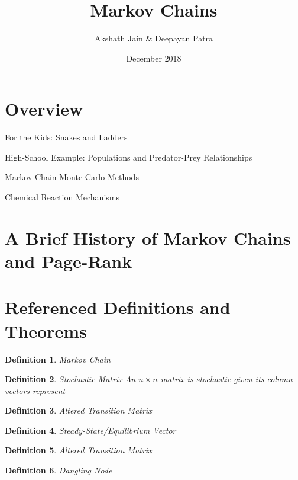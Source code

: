 \documentclass{article}
\title{Markov Chains}
\author{Akshath Jain \& Deepayan Patra}
\date{December 2018}
\newtheorem{definition}{Definition}
\begin{document}
\maketitle

\section{Overview}

For the Kids: Snakes and Ladders

High-School Example: Populations and Predator-Prey Relationships

Markov-Chain Monte Carlo Methods

Chemical Reaction Mechanisms

\section{A Brief History of Markov Chains and Page-Rank}

\section{Referenced Definitions and Theorems}
    \begin{definition}{Markov Chain}
    
    \end{definition}
    
    \begin{definition}{Stochastic Matrix}
    An $n \times n$ matrix is stochastic given its column vectors represent 
    \end{definition}
    
    \begin{definition}{Altered Transition Matrix}
    
    \end{definition}
    
    \begin{definition}{Steady-State/Equilibrium Vector}
    
    \end{definition}
    
    \begin{definition}{Altered Transition Matrix}

    \end{definition}
    
    \begin{definition}{Dangling Node}

    \end{definition}
    
\end{document}
